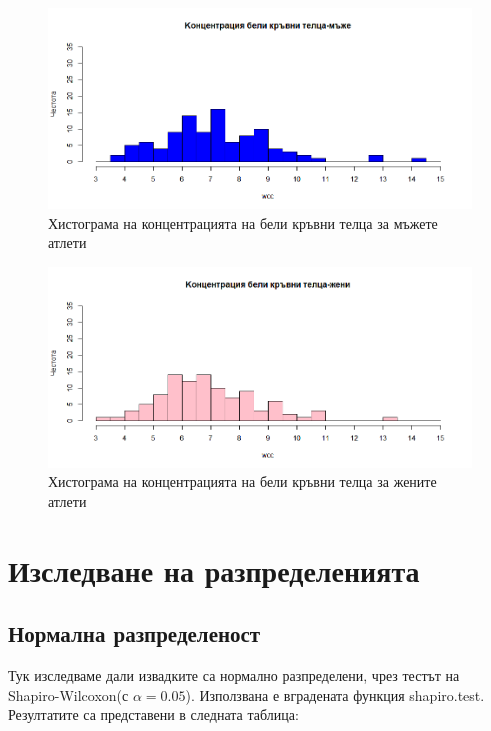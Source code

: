 \documentclass[12pt]{article} %
\begin{document}
\begin{large}
  \begin{figure}[h!]
    \includegraphics[width=\textwidth,height=\textheight,keepaspectratio]{pics/wccmen}
    \caption{Хистограма на концентрацията на бели кръвни телца за мъжете атлети}
  \end{figure}

  \begin{figure}[h!]
    \includegraphics[width=\textwidth,height=\textheight,keepaspectratio]{pics/wccwomen}
    \caption{Хистограма на концентрацията на бели кръвни телца за жените атлети}
  \end{figure}

  \section{Изследване на разпределенията}

  \subsection{Нормална разпределеност}
  Тук изследваме дали извадките са нормално разпределени, чрез тестът на Shapiro-Wilcoxon(с $\alpha=0.05$). Използвана е вградената функция shapiro.test. Резултатите са представени в следната таблица:


\end{large}
\end{document}
